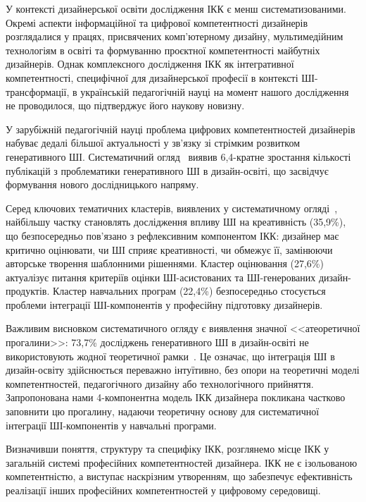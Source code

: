 У контексті дизайнерської освіти дослідження ІКК є менш систематизованими. Окремі аспекти інформаційної та цифрової компетентності дизайнерів розглядалися у працях, присвячених комп'ютерному дизайну, мультимедійним технологіям в освіті та формуванню проєктної компетентності майбутніх дизайнерів. Однак комплексного дослідження ІКК як інтегративної компетентності, специфічної для дизайнерської професії в контексті ШІ-трансформації, в українській педагогічній науці на момент нашого дослідження не проводилося, що підтверджує його наукову новизну.


У зарубіжній педагогічній науці проблема цифрових компетентностей дизайнерів набуває дедалі більшої актуальності у зв'язку зі стрімким розвитком генеративного ШІ. Систематичний огляд~\cite{Musiienko2026ScopingReview} виявив 6,4-кратне зростання кількості публікацій з проблематики генеративного ШІ в дизайн-освіті, що засвідчує формування нового дослідницького напряму.

Серед ключових тематичних кластерів, виявлених у систематичному огляді~\cite{Musiienko2026ScopingReview}, найбільшу частку становлять дослідження впливу ШІ на креативність (35,9\%), що безпосередньо пов'язано з рефлексивним компонентом ІКК: дизайнер має критично оцінювати, чи ШІ сприяє креативності, чи обмежує її, замінюючи авторське творення шаблонними рішеннями. Кластер оцінювання (27,6\%) актуалізує питання критеріїв оцінки ШІ-асистованих та ШІ-генерованих дизайн-продуктів. Кластер навчальних програм (22,4\%) безпосередньо стосується проблеми інтеграції ШІ-компонентів у професійну підготовку дизайнерів.

Важливим висновком систематичного огляду є виявлення значної <<атеоретичної прогалини>>: 73,7\% досліджень генеративного ШІ в дизайн-освіті не використовують жодної теоретичної рамки~\cite{Musiienko2026ScopingReview}. Це означає, що інтеграція ШІ в дизайн-освіту здійснюється переважно інтуїтивно, без опори на теоретичні моделі компетентностей, педагогічного дизайну або технологічного прийняття. Запропонована нами 4-компонентна модель ІКК дизайнера покликана частково заповнити цю прогалину, надаючи теоретичну основу для систематичної інтеграції ШІ-компонентів у навчальні програми.


Визначивши поняття, структуру та специфіку ІКК, розглянемо місце ІКК у загальній системі професійних компетентностей дизайнера. ІКК не є ізольованою компетентністю, а виступає наскрізним утворенням, що забезпечує ефективність реалізації інших професійних компетентностей у цифровому середовищі.


